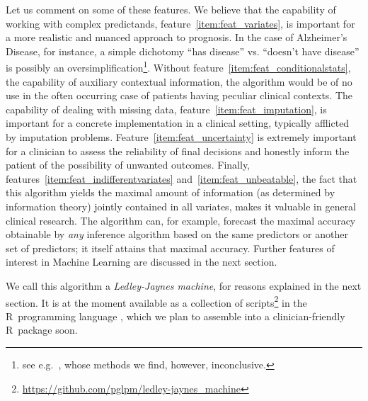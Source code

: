 \documentclass[utf8]{FrontiersinHarvard} %
\newcommand*{\eg}{{e.g.}}
\renewcommand*{\|}[1][]{\nonscript\:#1\vert\nonscript\:\mathopen{}}
\newcommand*{\ad}{Alzheimer's Disease}
\newcommand*{\ljm}{Ledley-Jaynes machine}
\begin{document}
Let us comment on some of these features. We believe that the capability of working with complex predictands, feature~\ref{item:feat_variates}, is important for a more realistic and nuanced approach to prognosis. In the case of \ad, for instance, a simple dichotomy \enquote{has disease} vs. \enquote{doesn't have disease} is possibly an oversimplification\footnote{see \eg\ \citet{edmondsetal2015,edmondsetal2020},  whose methods we find, however, inconclusive.}.
Without feature~\ref{item:feat_conditionalstats}, the capability of auxiliary contextual information, the algorithm would be of no use in the often occurring case of patients having peculiar clinical contexts. The capability of dealing with missing data, feature~\ref{item:feat_imputation}, is important for a concrete implementation in a clinical setting, typically afflicted by imputation problems. Feature~\ref{item:feat_uncertainty} is extremely important for a clinician to assess the reliability of final decisions and honestly inform the patient of the possibility of unwanted outcomes. Finally, features~\ref{item:feat_indifferentvariates} and~\ref{item:feat_unbeatable}, the fact that this algorithm yields the maximal amount of information (as determined by information theory) jointly contained in all variates, makes it valuable in general clinical research. The algorithm can, for example, forecast the maximal accuracy obtainable by \emph{any} inference algorithm based on the same predictors or another set of predictors; it itself attains that maximal accuracy. Further features of interest in Machine Learning are discussed in the next section.

We call this algorithm a \emph{\ljm}, for reasons explained in the next section. It is at the moment available as a collection of scripts\footnote{\url{https://github.com/pglpm/ledley-jaynes\_machine}} in the R~programming language \citep{rcoreteam1995_r2023}, which we plan to assemble into a clinician-friendly R~package soon.
\end{document}
